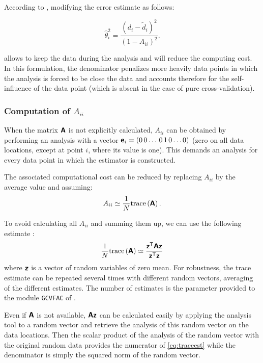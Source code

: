 According to \cite{CRAVEN78}, modifying the error estimate as follows:

\begin{equation}
{\hat{\theta}_i^2} =  \frac{(d_i - \tilde{d}_i)^2}{(1 - A_{ii})^2}.
\label{eq:misfitestimate}
\end{equation}

allows to keep the data during the analysis and will reduce the computing cost. In this formulation, the denominator penalizes more heavily data points in which the analysis is forced to be close the data and accounts therefore for the self-influence of the data point (which is absent in the case of pure cross-validation).

\subsubsection{Computation of $A_{ii}$}

When the matrix $\mbox{\boldmath $ \protect\mathsf{A} $}$ is not explicitly calculated, $A_{ii}$ can be obtained by performing an analysis with a vector $\mbox{\boldmath $ \protect\mathsf{e} $}_i=(0\,0\ldots\,0\,1\,0\ldots 0)$ (zero on all data locations, except at point $i$, where its value is one). This demands an analysis for every data point in which the estimator is constructed.

The associated computational cost can be reduced by replacing $A_{ii}$ by the average value and assuming:
\begin{equation}
A_{ii} \simeq \frac{1}{N} \mathrm{trace}\left( \mbox{\boldmath $ \protect\mathsf{A} $} \right).
\label{eq:aiitrace}
\end{equation}

To avoid calculating all $A_{ii}$ and summing them up, we can use the following estimate \citep{GIRARD89}:
\begin{equation}
\frac{1}{N} \mathrm{trace}\left( \mbox{\boldmath $ \protect\mathsf{A} $} \right) \simeq  \frac{ {\mbox{\boldmath $ \protect\mathsf{z} $}}^\mathsf{T} \mbox{\boldmath $ \protect\mathsf{A} $} \mbox{\boldmath $ \protect\mathsf{z} $} }{{\mbox{\boldmath $ \protect\mathsf{z} $}}^\mathsf{T} \mbox{\boldmath $ \protect\mathsf{z} $} }
\label{eq:traceest}
\end{equation}
where $\mbox{\boldmath $ \protect\mathsf{z} $}$ is a vector of random variables of zero mean. For robustness, the trace estimate can be repeated several times with different random vectors, averaging of the different estimates. The number of estimates is the parameter provided to the module \texttt{GCVFAC} of \diva.

Even if $\mbox{\boldmath $ \protect\mathsf{A} $}$ is not available, $\mbox{\boldmath $ \protect\mathsf{A} $} \mbox{\boldmath $ \protect\mathsf{z} $}$ can be calculated easily by applying the analysis tool to a random vector and retrieve the analysis of this random vector on the data locations. Then the scalar product of the analysis of the random vector with the original random data provides the numerator of \eqref{eq:traceest} while the denominator is simply the squared norm of the random vector.

